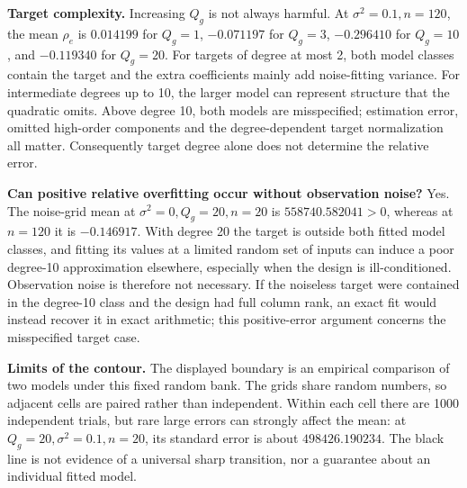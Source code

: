 \textbf{Target complexity.} Increasing $Q_g$ is not always harmful. At $\sigma^2=0.1,n=120$, the mean $\rho_e$ is $0.014199$ for $Q_g=1$, $-0.071197$ for $Q_g=3$, $-0.296410$ for $Q_g=10$, and $-0.119340$ for $Q_g=20$. For targets of degree at most 2, both model classes contain the target and the extra coefficients mainly add noise-fitting variance. For intermediate degrees up to 10, the larger model can represent structure that the quadratic omits. Above degree 10, both models are misspecified; estimation error, omitted high-order components and the degree-dependent target normalization all matter. Consequently target degree alone does not determine the relative error.

\textbf{Can positive relative overfitting occur without observation noise?} Yes. The noise-grid mean at $\sigma^2=0,Q_g=20,n=20$ is $558740.582041>0$, whereas at $n=120$ it is $-0.146917$. With degree 20 the target is outside both fitted model classes, and fitting its values at a limited random set of inputs can induce a poor degree-10 approximation elsewhere, especially when the design is ill-conditioned. Observation noise is therefore not necessary. If the noiseless target were contained in the degree-10 class and the design had full column rank, an exact fit would instead recover it in exact arithmetic; this positive-error argument concerns the misspecified target case.

\textbf{Limits of the contour.} The displayed boundary is an empirical comparison of two models under this fixed random bank. The grids share random numbers, so adjacent cells are paired rather than independent. Within each cell there are 1000 independent trials, but rare large errors can strongly affect the mean: at $Q_g=20,\sigma^2=0.1,n=20$, its standard error is about $498426.190234$. The black line is not evidence of a universal sharp transition, nor a guarantee about an individual fitted model.
